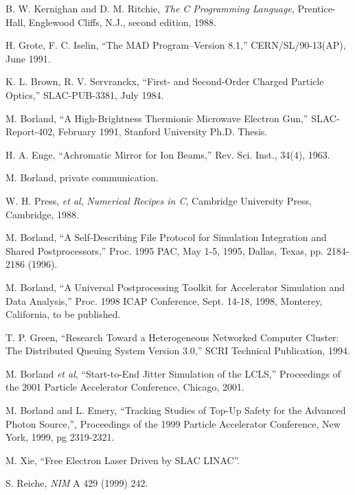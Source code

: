 \documentclass[11pt]{article}
\begin{document}
\newpage
\begin{thebibliography}{9}

    B. W. Kernighan and D. M. Ritchie, {\em The C Programming Language},
    Prentice-Hall, Englewood Cliffs, N.J., second edition, 1988.

    H. Grote, F. C. Iselin, ``The MAD Program--Version 8.1,'' CERN/SL/90-13(AP), June 1991.

    K. L. Brown, R. V. Servranckx, ``First- and Second-Order Charged Particle Optics,'' 
    SLAC-PUB-3381, July 1984.

    M. Borland, ``A High-Brightness Thermionic Microwave Electron Gun,'' SLAC-Report-402,
    February 1991, Stanford University Ph.D. Thesis.

    H. A. Enge, ``Achromatic Mirror for Ion Beams,'' Rev. Sci. Inst., 34(4), 1963.

    M. Borland, private communication.

    W. H. Press, {\em et al}, {\em Numerical Recipes in C}, Cambridge University
    Press, Cambridge, 1988.

M. Borland, ``A Self-Describing File Protocol for Simulation
Integration and Shared Postprocessors,'' Proc. 1995 PAC, May 1-5,
1995, Dallas, Texas, pp. 2184-2186 (1996).

M. Borland, ``A Universal Postprocessing Toolkit for Accelerator 
Simulation and Data Analysis,'' Proc. 1998 ICAP Conference, 
Sept. 14-18, 1998, Monterey, California, to be published.

 T. P. Green, ``Research Toward a Heterogeneous Networked
Computer Cluster: The Distributed Queuing System Version 3.0,'' SCRI
Technical Publication, 1994.

 M. Borland {\em et al}, ``Start-to-End Jitter Simulation
of the LCLS,'' Proceedings of the 2001 Particle Accelerator Conference,
Chicago, 2001.

 M. Borland and L. Emery, ``Tracking Studies of
Top-Up Safety for the Advanced Photon Source,'', Proceedings of the
1999 Particle Accelerator Conference, New York, 1999, pg 2319-2321.

 M. Xie, ``Free Electron Laser Driven by SLAC
LINAC''.

 S. Reiche, {\em NIM} A 429 (1999) 242.


\end{thebibliography}
\end{document}
